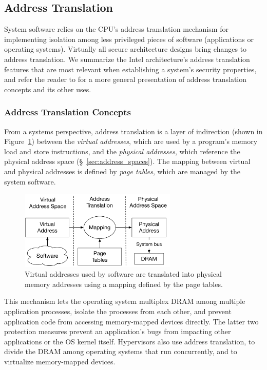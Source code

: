 \subsection{Address Translation}
\label{sec:paging}


System software relies on the CPU's address translation mechanism for
implementing isolation among less privileged pieces of software (applications
or operating systems). Virtually all secure architecture designs bring changes
to address translation. We summarize the Intel architecture's address
translation features that are most relevant when establishing a system's
security properties, and refer the reader to \cite{jacob1998virtual} for a more
general presentation of address translation concepts and its other uses.


\subsubsection{Address Translation Concepts}

From a systems perspective, address translation is a layer of indirection
(shown in Figure~\ref{fig:address_translation}) between the
\textit{virtual addresses}, which are used by a program's memory load and store
instructions, and the \textit{physical addresses}, which reference the physical
address space (\S~\ref{sec:address_spaces}). The mapping between virtual and
physical addresses is defined by \textit{page tables}, which are managed by the
system software.

\begin{figure}[hbt]
  \centering
  \includegraphics[width=75mm]{figures/address_translation.pdf}
  \caption{
    Virtual addresses used by software are translated into physical memory
    addresses using a mapping defined by the page tables.
  }
  \label{fig:address_translation}
\end{figure}

This mechanism lets the operating system multiplex DRAM among multiple
application processes, isolate the processes from each other, and prevent
application code from accessing memory-mapped devices directly. The latter two
protection measures prevent an application's bugs from impacting other
applications or the OS kernel itself. Hypervisors also use address translation,
to divide the DRAM among operating systems that run concurrently, and to
virtualize memory-mapped devices.

